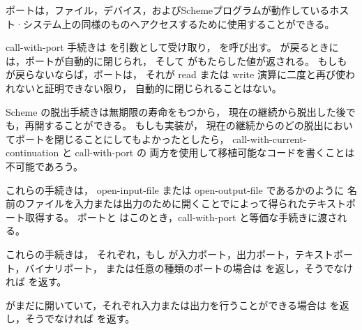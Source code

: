 ポートは，ファイル，デバイス，およびSchemeプログラムが動作しているホスト·システム上の同様のものへアクセスするために使用することができる。

\begin{entry}{%
}

{\cf call-with-port} 手続きは  を引数として受け取り，  を呼び出す。
 が戻るときには，ポートが自動的に閉じられ，
そして  がもたらした値が返される。
もしも  が戻らないならば，ポートは，
それが read または write 演算に二度と再び使われないと証明できない限り，
自動的に閉じられることはない。

\begin{rationale}
Scheme の脱出手続きは無期限の寿命をもつから，
現在の継続から脱出した後でも，再開することができる。
もしも実装が，
現在の継続からのどの脱出においてポートを閉じることにしてもよかったとしたら，
{\cf call-with-current-continuation} と {\cf call-with-port} の
両方を使用して移植可能なコードを書くことは不可能であろう。
\end{rationale} 

\end{entry}

\begin{entry}{%
}

これらの手続きは，
{\cf open-input-file} または {\cf open-output-file} であるかのように
名前のファイルを入力または出力のために開くことでによって得られたテキストポート取得する。
ポートと  はこのとき，{\cf call-with-port} と等価な手続きに渡される。
\end{entry}

\begin{entry}{%
}

これらの手続きは，
それぞれ，もし  が入力ポート，出力ポート，テキストポート，バイナリポート，
または任意の種類のポートの場合は \schtrue{} を返し，そうでなければ \schfalse を返す。

\end{entry}


\begin{entry}{%
}

 がまだに開いていて，それぞれ入力または出力を行うことができる場合は \schtrue{} を返し，そうでなければ \schfalse を返す。


\end{entry}



